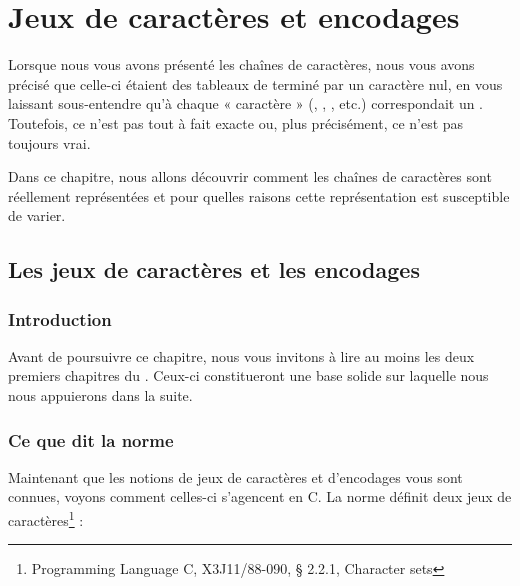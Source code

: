 \chapter{Jeux de caractères et encodages}
\label{jeux-de-caracteres-et-encodages}

  Lorsque nous vous   avons présenté les chaînes de caractères, nous vous 
  avons précisé que celle-ci étaient des tableaux de  terminé 
  par un caractère nul, en vous laissant sous-entendre qu'à chaque 
  « caractère » (,
  \mybox{\textquotesingle{};\textquotesingle{}},
  \mybox{\textquotesingle{}1\textquotesingle{}}, etc.) correspondait un
  . Toutefois, ce n'est pas tout à fait exacte ou, plus
  précisément, ce n'est pas toujours vrai.
  
  Dans ce chapitre, nous allons découvrir comment les chaînes de
caractères sont réellement représentées et pour quelles raisons cette
représentation est susceptible de varier.

\section{Les jeux de caractères et les encodages}
\label{les-jeux-de-caracteres-et-les-encodages}

\subsection{Introduction}
\label{introduction-}

\begin{infobox}
  Avant de poursuivre ce chapitre, nous
vous invitons à lire au moins les deux premiers chapitres du
. Ceux-ci constitueront une base solide sur
laquelle nous nous appuierons dans la suite.
\end{infobox}


\subsection{Ce que dit la norme}
\label{ce-que-dit-la-norme}

Maintenant que les notions de jeux de caractères et d'encodages vous
sont connues, voyons comment celles-ci s'agencent en C. La norme définit
deux jeux de caractères\footnote{\footnotesize{Programming Language C, X3J11/88-090, §
  2.2.1, Character sets}} :

